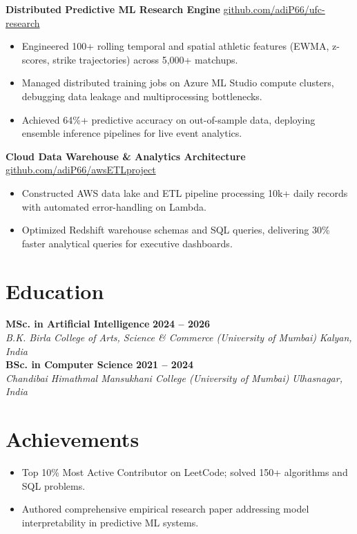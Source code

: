 \documentclass[10pt,a4paper]{article}
\begin{document}
\textbf{Distributed Predictive ML Research Engine} \hfill \href{https://github.com/adiP66/ufc-research}{github.com/adiP66/ufc-research}
\begin{itemize}
    \item Engineered 100+ rolling temporal and spatial athletic features (EWMA, z-scores, strike trajectories) across 5,000+ matchups.
    \item Managed distributed training jobs on Azure ML Studio compute clusters, debugging data leakage and multiprocessing bottlenecks.
    \item Achieved 64\%+ predictive accuracy on out-of-sample data, deploying ensemble inference pipelines for live event analytics.
\end{itemize}

\textbf{Cloud Data Warehouse \& Analytics Architecture} \hfill \href{https://github.com/adiP66/awsETLproject}{github.com/adiP66/awsETLproject}
\begin{itemize}
    \item Constructed AWS data lake and ETL pipeline processing 10k+ daily records with automated error-handling on Lambda.
    \item Optimized Redshift warehouse schemas and SQL queries, delivering 30\% faster analytical queries for executive dashboards.
\end{itemize}

\section*{Education}
\textbf{MSc. in Artificial Intelligence} \hfill \textbf{2024 -- 2026} \\
\textit{B.K. Birla College of Arts, Science \& Commerce (University of Mumbai)} \hfill \textit{Kalyan, India} \\[3pt]
\textbf{BSc. in Computer Science} \hfill \textbf{2021 -- 2024} \\
\textit{Chandibai Himathmal Mansukhani College (University of Mumbai)} \hfill \textit{Ulhasnagar, India}

\section*{Achievements}
\begin{itemize}
    \item Top 10\% Most Active Contributor on LeetCode; solved 150+ algorithms and SQL problems.
    \item Authored comprehensive empirical research paper addressing model interpretability in predictive ML systems.
\end{itemize}
\end{document}
